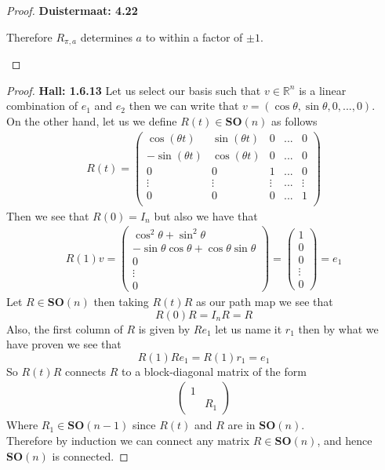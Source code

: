 \documentclass[11pt]{article}
\newcommand{\R}{\mathbb{R}}
\theoremstyle{definition}
\begin{document}
\begin{proof}{\textbf{Duistermaat: 4.22}}
\begin{itemize}
    Therefore $R_{\pi,a}$ determines $a$ to within a factor of $\pm 1$.
\end{itemize}
\end{proof}
\cleardoublepage
\begin{proof}{\textbf{Hall: 1.6.13}}
    Let us select our basis such that $v \in \R^n$ is a linear combination of
    $e_1$ and $e_2$ then we can write that 
    $v = (\cos\theta, \sin\theta, 0, ..., 0)$.\\
    On the other hand, let us we define $R(t) \in \bm{SO}(n)$ as follows
    \begin{align*}
        R(t) = \begin{pmatrix}
            \cos(\theta t) & \sin(\theta t) & 0 & ... & 0\\
            -\sin(\theta t) & \cos(\theta t) & 0 & ... & 0\\
            0 & 0 & 1 & ... & 0\\
            \vdots & \vdots & \vdots & ... & \vdots\\
            0 & 0 & 0 & ... & 1\\
        \end{pmatrix}
    \end{align*}
    Then we see that $R(0) = I_n$ but also we have that
    \begin{align*}
        R(1)v = \begin{pmatrix}
            \cos^2\theta + \sin^2\theta\\
            -\sin\theta\cos\theta + \cos\theta\sin\theta\\
            0 \\ \vdots\\ 0
        \end{pmatrix}
        = \begin{pmatrix}
            1\\ 0\\ 0 \\ \vdots\\ 0
        \end{pmatrix} = e_1
    \end{align*}
    Let $R \in \bm{SO}(n)$ then taking $R(t)R$ as our path map we see that
    $$R(0)R = I_n R = R$$
    Also, the first column of $R$ is given by $R e_1$ let us name it $r_1$ then
    by what we have proven we see that
    $$R(1)Re_1 = R(1)r_1 = e_1$$
    So $R(t)R$ connects $R$ to a block-diagonal matrix of the form
    \begin{align*}
        \begin{pmatrix}
            1 & \\
            & R_1 
        \end{pmatrix}
    \end{align*}
    Where $R_1 \in \bm{SO}(n - 1)$ since $R(t)$ and $R$ are in $\bm{SO}(n)$.\\
    Therefore by induction we can connect any matrix $R \in \bm{SO}(n)$, and 
    hence $\bm{SO}(n)$ is connected.
\end{proof}
\end{document}

